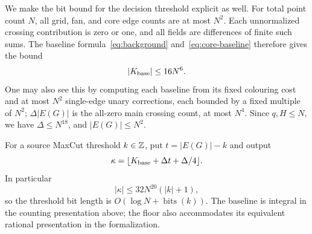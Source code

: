 We make the bit bound for the decision threshold explicit as well. For total point count $N$, all grid, fan, and core edge counts are at most $N^2$. Each unnormalized crossing contribution is zero or one, and all fields are differences of finite such sums. The baseline formula~\eqref{eq:background} and~\eqref{eq:core-baseline} therefore gives the bound
\[
|K_{\rm base}|\leq16N^6.
\]
One may also see this by computing each baseline from its fixed colouring cost and at most $N^2$ single-edge unary corrections, each bounded by a fixed multiple of $N^2$; $\Delta|E(G)|$ is the all-zero main crossing count, at most $N^4$. Since $q,H\leq N$, we have $\Delta\leq N^{18}$, and $|E(G)|\leq N^2$.

For a source MaxCut threshold $k\in\mathbb Z$, put $t=|E(G)|-k$ and output
\begin{equation}\label{eq:decision-threshold}
\kappa=\floor*{K_{\rm base}+\Delta t+\Delta/4}.
\end{equation}
In particular
\begin{equation}\label{eq:threshold-bits}
|\kappa|\leq32N^{20}(|k|+1),
\end{equation}
so the threshold bit length is $O(\log N+\operatorname{bits}(k))$. The baseline is integral in the counting presentation above; the floor also accommodates its equivalent rational presentation in the formalization.

